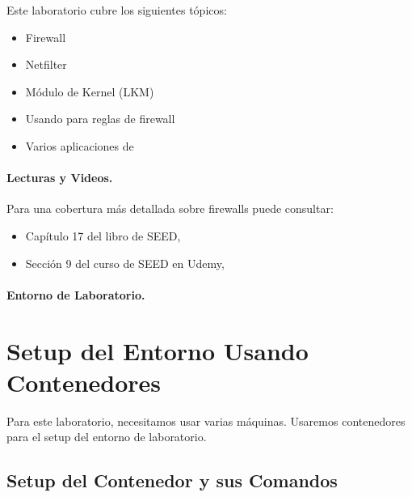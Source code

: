 Este laboratorio cubre los siguientes tópicos:


\begin{itemize}[noitemsep]
\item Firewall
\item Netfilter
\item Módulo de Kernel (LKM)
\item Usando \iptables para reglas de firewall
\item Varios aplicaciones de \iptables
\end{itemize}


\paragraph{Lecturas y Videos.}
Para una cobertura más detallada sobre firewalls puede consultar:

\begin{itemize}
\item Capítulo 17 del libro de SEED, \seedbook
\item Sección 9 del curso de SEED en Udemy, \seedisvideo
\end{itemize}


\paragraph{Entorno de Laboratorio.} \seedenvironmentC




\section{Setup del Entorno Usando Contenedores}

Para este laboratorio, necesitamos usar varias máquinas.
Usaremos contenedores para el setup del entorno de laboratorio.



\subsection{Setup del Contenedor y sus Comandos}





